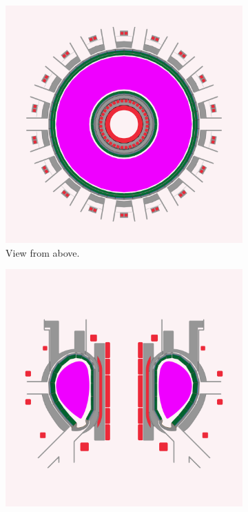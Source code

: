 \begin{figure}
    \centering
    \begin{subfigure}{0.45\linewidth}
        \includegraphics{Figures/Chapter1/blanket_shimwell_top_view.png}
        \caption{View from above.}
    \end{subfigure}%
    \qquad
    \begin{subfigure}{0.45\linewidth}
        \includegraphics{Figures/Chapter1/blanket_shimwell_side_view.png}

\end{subfigure}
\end{figure}
